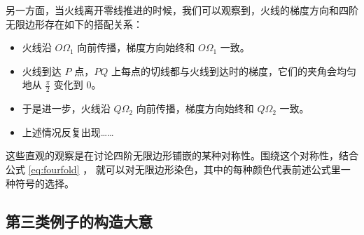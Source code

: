 \documentclass[a4paper,12pt]{article}
\numberwithin{problem}{section}
\numberwithin{definition}{section}
\numberwithin{lemma}{section}
\numberwithin{proposition}{section}
\numberwithin{theorem}{section}
\numberwithin{grammar}{section}
\numberwithin{program}{section}
\numberwithin{convention}{section}
\numberwithin{corollary}{section}
\begin{document}
另一方面，当火线离开零线推进的时候，我们可以观察到，火线的梯度方向和四阶无限边形存在如下的搭配关系：

\begin{itemize}
    \item 火线沿 $O\Omega_{1}$ 向前传播，梯度方向始终和 $O\Omega_{1}$ 一致。
    \item 火线到达 $P$ 点，$PQ$ 上每点的切线都与火线到达时的梯度，它们的夹角会均匀地从 $\frac{\pi}{2}$ 变化到 $0$。
    \item 于是进一步，火线沿 $Q\Omega_{2}$ 向前传播，梯度方向始终和 $Q\Omega_{2}$ 一致。
    \item 上述情况反复出现……
\end{itemize}

这些直观的观察是在讨论四阶无限边形铺嵌的某种对称性。围绕这个对称性，结合公式 \ref{eq:fourfold} ，
就可以对无限边形染色，其中的每种颜色代表前述公式里一种符号的选择。

\subsection{第三类例子的构造大意}
\end{document}
